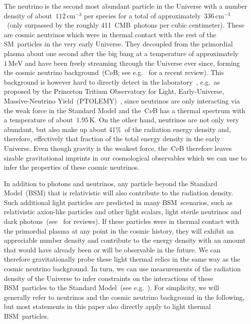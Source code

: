 The neutrino is the second most abundant particle in the Universe with a number density of about~$112\,\mathrm{cm}^{-3}$ per species for a total of approximately~$336\,\mathrm{cm}^{-3}$~(only surpassed by the roughly 411~CMB~photons per cubic centimeter). These are cosmic neutrinos which were in thermal contact with the rest of the SM~particles in the very early Universe. They decoupled from the primordial plasma about one second after the big bang at a temperature of approximately~$1\,\mathrm{MeV}$ and have been freely streaming through the Universe ever since, forming the cosmic neutrino background~(C$\nu$B; see e.g.~\cite{Scott:2024rwc} for a recent review). This background is however hard to directly detect in the laboratory~\cite{Bauer:2022lri}, e.g.\ as proposed by the Princeton Tritium Observatory for Light, Early-Universe, Massive-Neutrino Yield~(PTOLEMY)~\cite{PTOLEMY:2019hkd}, since neutrinos are only interacting via the weak force in the Standard Model and the~C$\nu$B has a thermal spectrum with a temperature of about~$1.95\,\mathrm{K}$. On the other hand, neutrinos are not only very abundant, but also make up about 41\%~of the radiation energy density and, therefore, effectively that fraction of the total energy density in the early Universe. Even though gravity is the weakest force, the~C$\nu$B therefore leaves sizable gravitational imprints in our cosmological observables which we can use to infer the properties of these cosmic neutrinos.\medskip

In addition to photons and neutrinos, any particle beyond the Standard Model~(BSM) that is relativistic will also contribute to the radiation density. Such additional light particles are predicted in many BSM~scenarios, such as relativistic axion-like particles and other light scalars, light sterile neutrinos and dark photons~(see~\cite{Abazajian:2012ys, Marsh:2015xka, Hook:2018dlk, Green:2019glg, Allahverdi:2020bys, Asadi:2022njl, Dvorkin:2022jyg, Antel:2023hkf} for reviews). If these particles were in thermal contact with the primordial plasma at any point in the cosmic history, they will exhibit an appreciable number density and contribute to the energy density with an amount that would have already been or will be observable in the future. We can therefore gravitationally probe these light thermal relics in the same way as the cosmic neutrino background. In turn, we can use measurements of the radiation density of the Universe to infer constraints on the interactions of these BSM~particles to the Standard Model~(see e.g.~\cite{Brust:2013ova, Chacko:2015noa, Baumann:2016wac, Ferreira:2018vjj, DEramo:2018vss, Arias-Aragon:2020shv, Ghosh:2020vti, Ferreira:2020bpb, Dror:2021nyr, Green:2021hjh, DEramo:2021usm, Caloni:2022uya, Bianchini:2023ubu, DEramo:2023nzt, Badziak:2024szg, Badziak:2024qjg, DEramo:2024jhn}). For simplicity, we will generally refer to neutrinos and the cosmic neutrino background in the following, but most statements in this paper also directly apply to light thermal BSM~particles.\medskip

